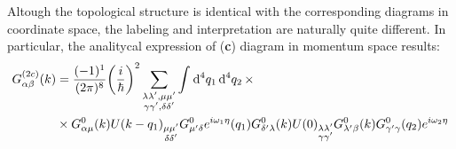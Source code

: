 \documentclass[11pt, a4paper, twoside, openright]{article}
\begin{document}
Altough the topological structure is identical with the corresponding diagrams in coordinate space, the labeling and interpretation are naturally quite different.
In particular, the analitycal expression of (\textbf{c}) diagram in momentum space results:
\begin{equation*}
\begin{split}
  G_{\alpha \beta }^{(2c)} (k) &=  \frac{(-1)^1}{(2 \pi )^{8}} \qty(\frac{i}{\hbar })^2
   \sum_{\substack{\lambda \lambda', \mu \mu' \\ \gamma \gamma', \delta \delta'   } }^{}  \int_{}^{} \dd[4]{q_1} \dd[4]{q_2}   \times \\
   &
   \times G^0_{\alpha \mu } (k) U (k-q_1)_{\substack{ \mu \mu' \\ \delta \delta'} } G^0_{\mu' \delta } e^{i \omega_1 \eta } (q_1) G^0_{\delta' \lambda  } (k) U (0)_{\substack{ \lambda \lambda' \\ \gamma \gamma'} } G^0_{\lambda' \beta  } (k) G^0_{\gamma' \gamma  } (q_2) e^{i \omega_2 \eta }
\end{split}
\end{equation*}
\end{document}
